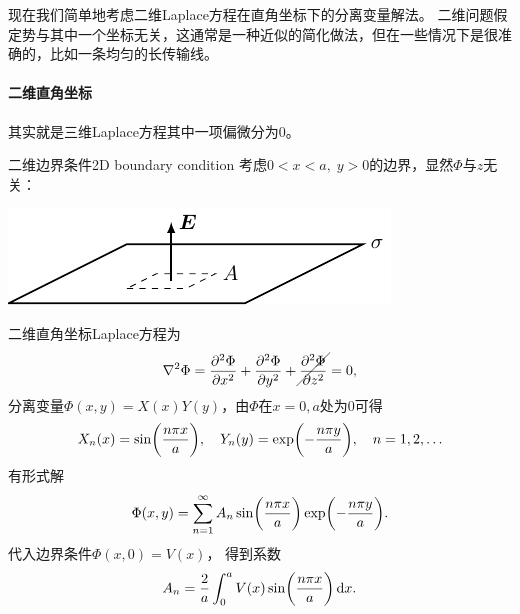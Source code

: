 现在我们简单地考虑二维Laplace方程在直角坐标下的分离变量解法。
二维问题假定势与其中一个坐标无关，这通常是一种近似的简化做法，但在一些情况下是很准确的，比如一条均匀的长传输线。

\paragraph{二维直角坐标}

其实就是三维Laplace方程其中一项偏微分为0。

\begin{example}{二维边界条件}{2D boundary condition}
    考虑$0<x<a,\;y>0$的边界，显然$\Phi$与$z$无关：
    \begin{center}
        \includegraphics[page=12]{figures/tikz/layouts.pdf}
    \end{center}
    二维直角坐标Laplace方程为
    \[
        \lap\Phi=\pv[2]\Phi x+\pv[2]\Phi y+\cancel{\pv[2]\Phi z}=0,
    \]
    分离变量$\Phi(x,y)=X(x)Y(y)$，由$\Phi$在$x=0,a$处为0可得
    \[
        X_n(x)=\sin\biggkh{\frac{n\pi x}a},\quad Y_n(y)=\exp\biggkh{-\frac{n\pi y}a},\quad n=1,2,\ldots
    \]
    有形式解
    \begin{equation}
        \Phi(x,y)=\sum_{n=1}^\infty A_n\sin\biggkh{\frac{n\pi x}a}\exp\biggkh{-\frac{n\pi y}a}.
    \end{equation}
    代入边界条件$\Phi(x,0)=V(x)$，
    得到系数
    \[
        A_n=\frac2a\int_0^aV(x)\sin\biggkh{\frac{n\pi x}a}\d x.
    \]
\end{example}
